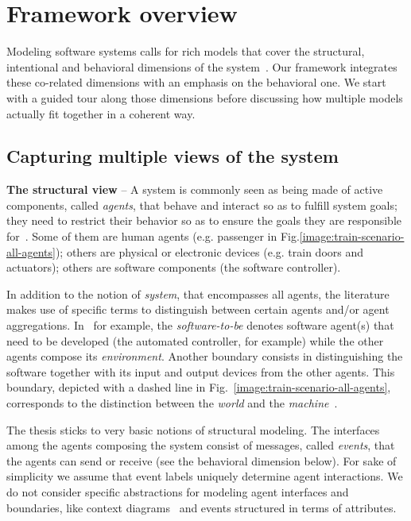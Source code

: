 \section{Framework overview\label{section:background-multi-agent-systems-and-behavior-modeling}}

Modeling software systems calls for rich models that cover the structural, intentional and behavioral dimensions of the system~\cite{VanLamsweerde:2000}. Our framework integrates these co-related dimensions with an emphasis on the behavioral one. We start with a guided tour along those dimensions before discussing how multiple models actually fit together in a coherent way.

\subsection{Capturing multiple views of the system\label{subsection:background-multiple-views}}


\noindent \textbf{The structural view} -- A system is commonly seen as being made of active components, called \emph{agents}, that behave and interact so as to fulfill system goals; they need to restrict their behavior so as to ensure the goals they are responsible for~\cite{Feather:1987}. Some of them are human agents (e.g. passenger in Fig.\ref{image:train-scenario-all-agents}); others are physical or electronic devices (e.g. train doors and actuators); others are software components (the software controller).

In addition to the notion of \emph{system}, that encompasses all agents, the literature makes use of specific terms to distinguish between certain agents and/or agent aggregations. In~\cite{VanLamsweerde:2009} for example, the \emph{software-to-be} denotes software agent(s) that need to be developed (the automated controller, for example) while the other agents compose its \emph{environment}. Another boundary consists in distinguishing the software together with its input and output devices from the other agents. This boundary, depicted with a dashed line in Fig.~\ref{image:train-scenario-all-agents}, corresponds to the distinction between the \emph{world} and the \emph{machine}~\cite{Jackson:1995}.

The thesis sticks to very basic notions of structural modeling. The interfaces among the agents composing the system consist of messages, called \emph{events}, that the agents can send or receive (see the behavioral dimension below). For sake of simplicity we assume that event labels uniquely determine agent interactions. We do not consider specific abstractions for modeling agent interfaces and boundaries, like context diagrams~\cite{Jackson:1995} and events structured in terms of attributes.

